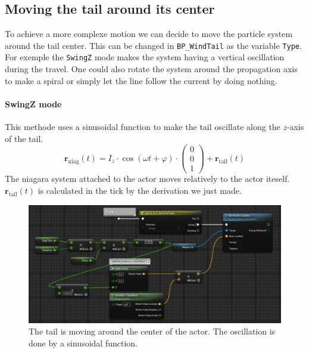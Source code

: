 \documentclass[../main.tex]{subfile}
\begin{document}
    \subsection{Moving the tail around its center}
    To achieve a more complexe motion we can decide to move the particle system around the tail center. This can be changed in \texttt{BP\_WindTail} as the variable \texttt{Type}.
     For exemple the \texttt{SwingZ} mode makes the system having a vertical
    oscillation during the travel. One could also rotate the system around the propagation axis to make a spiral or simply let the line follow the current by doing nothing.\\

    \paragraph{SwingZ mode}
    This methode uses a sinusoidal function to make the tail oscillate along the $z$-axis of the tail. 
    \[
        \bm{r}_{\text{niag}}(t) = I_z\cdot \cos(\omega t + \varphi) \cdot \begin{pmatrix}0\\0\\1\end{pmatrix} + \bm{r}_{\text{tail}}(t) 
    \]
    The niagara system attached to the actor moves relatively to the actor iteself.
    $\bm{r}_{\text{tail}}(t)$ is calculated in the tick by the derivation we just made.
    \begin{figure}[H]
        \centering
        \includegraphics[width=1\textwidth]{Ressources/TailSwingZ.png}
        \caption{The tail is moving around the center of the actor. The oscillation is done by a sinusoidal function.}
    \end{figure}
\end{document}
